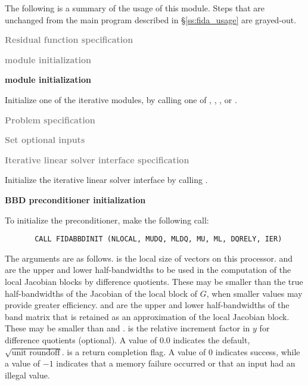 The following is a summary of the usage of this module. Steps that are unchanged
from the main program described in \S\ref{ss:fida_usage} are grayed-out.

\begin{Steps}

\item \textcolor{gray}{\bf Residual function specification}

\item \textcolor{gray}{\bf {\nvector} module initialization}

\item {\bf {\sunlinsol} module initialization}

  Initialize one of the iterative {\sunlinsol} modules, by calling one
  of , , ,
   or .

\item \textcolor{gray}{\bf Problem specification}

\item \textcolor{gray}{\bf Set optional inputs}

\item \textcolor{gray}{\bf Iterative linear solver interface specification}

  Initialize the {\idaspils} iterative linear solver interface
  by calling .

\item {\bf BBD preconditioner initialization}

  To initialize the {\idabbdpre} preconditioner, make the following call:
\begin{verbatim}
       CALL FIDABBDINIT (NLOCAL, MUDQ, MLDQ, MU, ML, DQRELY, IER)
\end{verbatim}
  The arguments are as follows.
   is the local size of vectors on this processor.
   and  are the upper and lower half-bandwidths to be used in
  the computation of the local Jacobian blocks by difference quotients.
  These may be smaller than the true half-bandwidths of the
  Jacobian of the local block of $G$, when smaller values may
  provide greater efficiency.
   and  are the upper and lower half-bandwidths of the band matrix
  that  is retained as an approximation of the local Jacobian block.
  These may be smaller than  and .
   is the relative increment factor in $y$ for difference quotients
  (optional). A value of $0.0$ indicates the default, $\sqrt{\text{unit roundoff}}$.
   is a return completion flag.  A value of $0$ indicates success, while
  a value of $-1$ indicates that a memory failure occurred or that an input had
  an illegal value.


\end{Steps}
